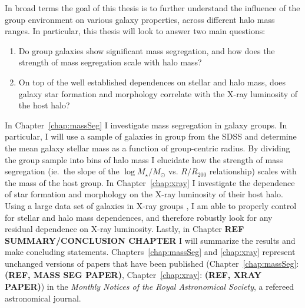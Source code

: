 In broad terms the goal of this thesis is to further understand the
influence of the group environment on various galaxy properties,
across different halo mass ranges.  In particular, this thesis will
look to answer two main questions:

\begin{enumerate}
  \item Do group galaxies show significant mass segregation, and how
    does the strength of mass segregation scale with halo mass?

  \item On top of the well established dependences on stellar and halo
    mass, does galaxy star formation and morphology correlate with the
    X-ray luminosity of the host halo?
\end{enumerate}

In Chapter~\ref{chap:massSeg} I investigate mass segregation in galaxy
groups.  In particular, I will use a sample of galaxies in group from
the SDSS \citep{yang2005, yang2007} and determine the mean galaxy
stellar mass as a function of group-centric radius.  By dividing the
group sample into bins of halo mass I elucidate how the strength of
mass segregation (ie.\ the slope of the $\log M_\star/M_\odot$
vs. $R/R_{200}$ relationship) scales with the mass of the host group.
In Chapter~\ref{chap:xray} I investigate the dependence of star
formation and morphology on the X-ray luminosity of their host halo.
Using a large data set of galaxies in X-ray groups \citep{wang2014}, I
am able to properly control for stellar and halo mass dependences, and
therefore robustly look for any residual dependence on X-ray
luminosity.  Lastly, in Chapter \textbf{REF SUMMARY/CONCLUSION
  CHAPTER} I will summarize the results and make concluding
statements.  Chapters~\ref{chap:massSeg} and \ref{chap:xray} represent
unchanged versions of papers that have been published
(Chapter~\ref{chap:massSeg}: \textbf{(REF, MASS SEG PAPER)},
Chapter~\ref{chap:xray}: \textbf{(REF, XRAY PAPER)}) in the
\textit{Monthly Notices of the Royal Astronomical Society}, a refereed
astronomical journal.

%


